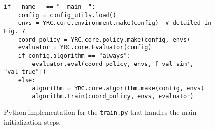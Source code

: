 \begin{figure*}[t]
\centering
\begin{tcolorbox}[title={\begin{pseudo}Main Training Script\end{pseudo}}, colback=sbPurple025, colframe=sbPurple]
\begin{verbatim}
if __name__ == "__main__":
    config = config_utils.load()
    envs = YRC.core.environment.make(config)  # detailed in Fig. 7
    coord_policy = YRC.core.policy.make(config, envs)
    evaluator = YRC.core.Evaluator(config)
    if config.algorithm == "always":
        evaluator.eval(coord_policy, envs, ["val_sim", "val_true"])
    else:
        algorithm = YRC.core.algorithm.make(config, envs)
        algorithm.train(coord_policy, envs, evaluator)
\end{verbatim}
\end{tcolorbox}
\caption{Python implementation for the \texttt{train.py} that handles the main initialization steps.}
\label{fig:train}
\end{figure*}

